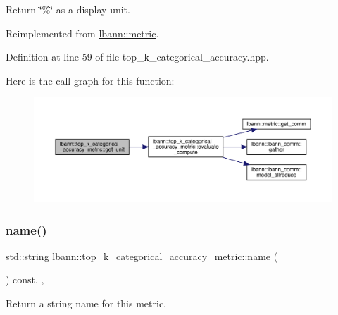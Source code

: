 Return \char`\"{}\%\char`\"{} as a display unit. 

Reimplemented from \hyperlink{classlbann_1_1metric_a13fd302dec85190b877f7146529e516c}{lbann\+::metric}.



Definition at line 59 of file top\+\_\+k\+\_\+categorical\+\_\+accuracy.\+hpp.


Here is the call graph for this function\+:\nopagebreak
\begin{figure}[H]
\begin{center}
\leavevmode
\includegraphics[width=350pt]{classlbann_1_1top__k__categorical__accuracy__metric_a0531d4f199fa61ce448af8c945ff3dfc_cgraph}
\end{center}
\end{figure}
\mbox{\label{classlbann_1_1top__k__categorical__accuracy__metric_a7b49f722f75dabe73c0fc3500d72ef63}} 
\subsubsection{\texorpdfstring{name()}{name()}}
{\footnotesize\ttfamily std\+::string lbann\+::top\+\_\+k\+\_\+categorical\+\_\+accuracy\+\_\+metric\+::name (\begin{DoxyParamCaption}{ }\end{DoxyParamCaption}) const\hspace{0.3cm}{\ttfamily [inline]}, {\ttfamily [override]}, {\ttfamily [virtual]}}

Return a string name for this metric. 

